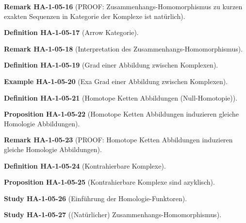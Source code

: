 \documentclass[10pt, letterpaper]{article}
\newcommand{\CustomHeading}[3]{%
  \par\medskip\noindent%
  \textbf{#1 #2} \textnormal{(#3)}.\enskip%
}
\newenvironment{DEF}[2]{\CustomHeading{Definition}{#1}{#2}}{}
\newenvironment{PROP}[2]{\CustomHeading{Proposition}{#1}{#2}}{}
\newenvironment{REM}[2]{\CustomHeading{Remark}{#1}{#2}}{}
\newenvironment{EXA}[2]{\CustomHeading{Example}{#1}{#2}}{}
\newenvironment{STUD}[2]{\CustomHeading{Study}{#1}{#2}}{}
\begin{document}
\begin{REM}{HA-1-05-16}{PROOF: Zusammenhangs-Homomorphismus zu kurzen exakten Sequenzen in Kategorie der Komplexe ist natürlich}
\end{REM}

\begin{DEF}{HA-1-05-17}{Arrow Kategorie}
\end{DEF}

\begin{REM}{HA-1-05-18}{Interpretation des Zusammenhangs-Homomorphismus}
\end{REM}

\begin{DEF}{HA-1-05-19}{Grad einer Abbildung zwischen Komplexen}
\end{DEF}

\begin{EXA}{HA-1-05-20}{Exa Grad einer Abbildung zwischen Komplexen}
\end{EXA}

\begin{DEF}{HA-1-05-21}{Homotope Ketten Abbildungen (Null-Homotopie)}
\end{DEF}

\begin{PROP}{HA-1-05-22}{Homotope Ketten Abbildungen induzieren gleiche Homologie Abbildungen}
\end{PROP}

\begin{REM}{HA-1-05-23}{PROOF: Homotope Ketten Abbildungen induzieren gleiche Homologie Abbildungen}
\end{REM}

\begin{DEF}{HA-1-05-24}{Kontrahierbare Komplexe}
\end{DEF}

\begin{PROP}{HA-1-05-25}{Kontrahierbare Komplexe sind azyklisch}
\end{PROP}

\begin{STUD}{HA-1-05-26}{Einführung der Homologie-Funktoren}
\end{STUD}

\begin{STUD}{HA-1-05-27}{(Natürlicher) Zusammenhangs-Homomorphismus}
\end{STUD}
\end{document}
